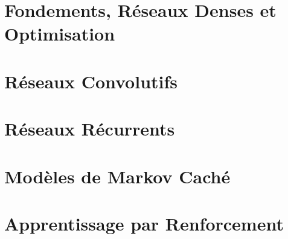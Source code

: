 



\chapter{Fondements, Réseaux Denses et Optimisation}


\chapter{Réseaux Convolutifs}


\chapter{Réseaux Récurrents}


% 

\chapter{Modèles de Markov Caché}


\chapter{Apprentissage par Renforcement}
